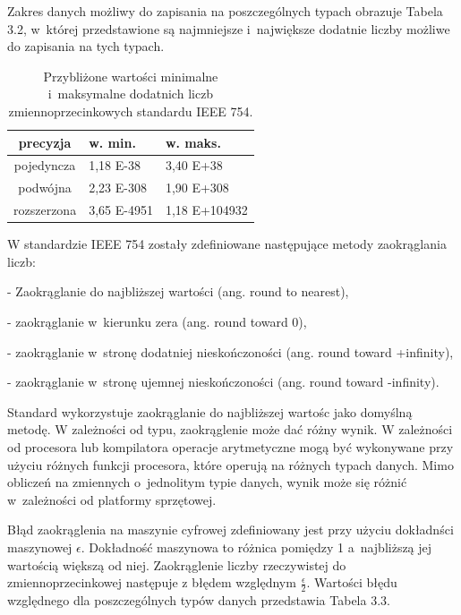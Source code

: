 Zakres danych możliwy do zapisania na poszczególnych typach obrazuje Tabela 3.2, w~której przedstawione są najmniejsze i~największe dodatnie liczby możliwe do zapisania na tych typach.

\begin{table}[H]
        \centering
        \begin{threeparttable}
                \caption{Przybliżone wartości minimalne i~maksymalne dodatnich liczb zmiennoprzecinkowych standardu IEEE 754.}\label{tab:table_exampleazd}
                \begin{tabularx}{0.6\textwidth}{| c | X | X |}
                        \midrule
                        	precyzja	&	w. min. & w. maks. \\
\midrule
		pojedyncza  & 1,18 E-38 & 3,40 E+38 \\
                        podwójna  & 2,23 E-308 & 1,90 E+308 \\
		rozszerzona &  3,65 E-4951 & 1,18 E+104932 \\
                        \bottomrule
                \end{tabularx}
        \end{threeparttable}
\end{table}

W standardzie IEEE 754 zostały zdefiniowane następujące metody zaokrąglania liczb:

- Zaokrąglanie do najbliższej wartości (ang. round to nearest),

- zaokrąglanie w~kierunku zera (ang. round toward 0),

- zaokrąglanie w~stronę dodatniej nieskończoności (ang. round toward +infinity),

- zaokrąglanie w~stronę ujemnej nieskończoności (ang. round toward -infinity).

Standard wykorzystuje zaokrąglanie do najbliższej wartośc jako domyślną metodę. W zależności od typu, zaokrąglenie może dać różny wynik. W zależności od procesora lub kompilatora operacje arytmetyczne mogą być wykonywane przy użyciu różnych funkcji procesora, które operują na różnych typach danych. Mimo obliczeń na zmiennych o~jednolitym typie danych, wynik może się różnić w~zależności od platformy sprzętowej.

Błąd zaokrąglenia na maszynie cyfrowej zdefiniowany jest przy użyciu dokładnści maszynowej $\epsilon$. Dokładność maszynowa to różnica pomiędzy 1 a~najbliższą jej wartością większą od niej. Zaokrąglenie liczby rzeczywistej do zmiennoprzecinkowej następuje z błędem względnym $\frac{\epsilon}{2}$. Wartości błędu względnego dla poszczególnych typów danych przedstawia Tabela 3.3. 

